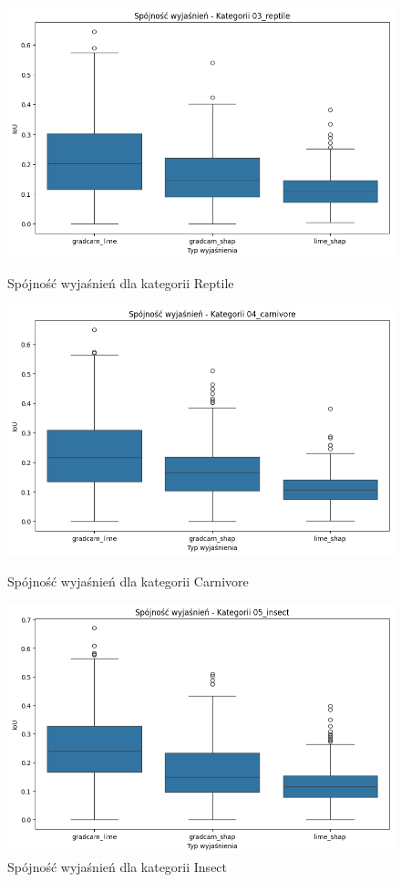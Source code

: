 \begin{figure}
	\centering
	\begin{minipage}[b]{0.3\textwidth}
		\centering\includegraphics[width=.9\textwidth]{img/base_coherence_reptile}
		\caption{Spójność wyjaśnień dla kategorii Reptile}  \label{}
	\end{minipage}
	\begin{minipage}[b]{0.3\textwidth}
		\centering\includegraphics[width=.9\textwidth]{img/base_coherence_carnivore}
		\caption{Spójność wyjaśnień dla kategorii Carnivore}  \label{}
	\end{minipage}
	\begin{minipage}[b]{0.3\textwidth}
		\centering\includegraphics[width=.9\textwidth]{img/base_coherence_insect}
		\caption{Spójność wyjaśnień dla kategorii Insect}  \label{}
	\end{minipage}
\end{figure}
